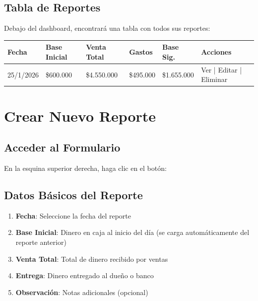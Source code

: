 \documentclass[12pt,a4paper]{article}
\begin{document}
\subsection{Tabla de Reportes}

Debajo del dashboard, encontrará una tabla con todos sus reportes:

\begin{center}
\begin{tabularx}{\textwidth}{|l|X|X|X|X|l|}
\hline
\rowcolor{primary!20}
\textbf{Fecha} & \textbf{Base Inicial} & \textbf{Venta Total} & \textbf{Gastos} & \textbf{Base Sig.} & \textbf{Acciones} \\
\hline
25/1/2026 & \$600.000 & \$4.550.000 & \$495.000 & \$1.655.000 & \footnotesize Ver | Editar | Eliminar \\
\hline
\end{tabularx}
\end{center}

\newpage

\section{Crear Nuevo Reporte}

\subsection{Acceder al Formulario}

\begin{tcolorbox}[colback=secondary!10,colframe=secondary,title=\faPlus~ Botón Nuevo Reporte]
En la esquina superior derecha, haga clic en el botón:

\end{tcolorbox}

\subsection{Datos Básicos del Reporte}

\begin{enumerate}
    \item \textbf{Fecha}: Seleccione la fecha del reporte
    \item \textbf{Base Inicial}: Dinero en caja al inicio del día (se carga automáticamente del reporte anterior)
    \item \textbf{Venta Total}: Total de dinero recibido por ventas
    \item \textbf{Entrega}: Dinero entregado al dueño o banco
    \item \textbf{Observación}: Notas adicionales (opcional)
\end{enumerate}
\end{document}
